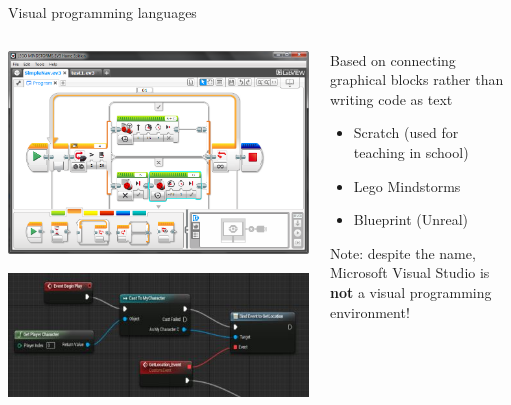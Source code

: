\begin{frame}{Visual programming languages}
	\begin{columns}
		\begin{column}{0.4\textwidth}
			\includegraphics[width=\textwidth]{mindstorms}
			\par\vspace{2ex}\par
			\includegraphics[width=\textwidth]{blueprint}
		\end{column}
		\begin{column}{0.58\textwidth}
			\pause Based on connecting graphical blocks rather than writing code as text
			\begin{itemize}
				\pause\item Scratch (used for teaching in school)
				\pause\item Lego Mindstorms
				\pause\item Blueprint (Unreal)
			\end{itemize}
			\pause Note: despite the name, Microsoft Visual Studio is \textbf{not}
				a visual programming environment!
		\end{column}
	\end{columns}
\end{frame}

